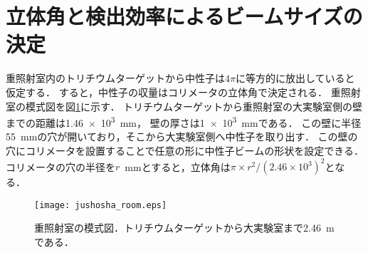 \documentclass[../master]{subfiles}
\begin{document}
\section{立体角と検出効率によるビームサイズの決定}
重照射室内のトリチウムターゲットから中性子は$4\pi$に等方的に放出していると仮定する．
すると，中性子の収量はコリメータの立体角で決定される．
重照射室の模式図を図\ref{fig::jushosha_room}に示す．
トリチウムターゲットから重照射室の大実験室側の壁までの距離は\SI{1.46e3}{\milli\metre}，
壁の厚さは\SI{1e3}{\milli\metre}である．
この壁に半径\SI{55}{\milli\metre}の穴が開いており，そこから大実験室側へ中性子を取り出す．
この壁の穴にコリメータを設置することで任意の形に中性子ビームの形状を設定できる．
コリメータの穴の半径を$r$~\si{\milli\metre}とすると，立体角は$\pi\times r^2/\left(2.46\times10^3\right)^2$となる．
\begin{figure}
  \centering
  \texttt{[image: jushosha\_room.eps]}
  \caption{重照射室の模式図．トリチウムターゲットから大実験室まで\SI{2.46}{\metre}である．}
  \label{fig::jushosha_room}
\end{figure}
\end{document}
